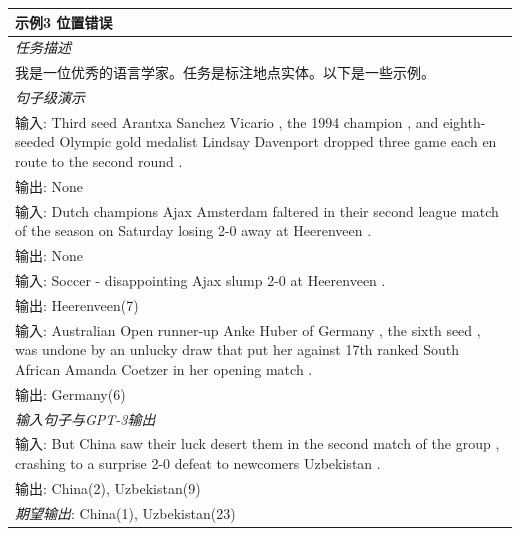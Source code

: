 \documentclass[supercite]{Experimental_Report}
\theoremstyle{definition}
\begin{document}
\begin{table}[th!]
{\begin{tabular}{l}
\textbf{示例3 {\color{red} 位置错误}} \\\midrule
       	\textit{任务描述} \\
我是一位优秀的语言学家。任务是标注地点实体。以下是一些示例。 \\\midrule
\textit{句子级演示} \\
输入: Third seed Arantxa Sanchez Vicario , the 1994 champion , and eighth-seeded Olympic gold medalist Lindsay Davenport dropped three game each en route to the second round . \\
输出: None \\
输入: Dutch champions Ajax Amsterdam faltered in their second league match of the season on Saturday losing 2-0 away at Heerenveen . \\
输出: None \\
输入: Soccer - disappointing Ajax slump 2-0 at Heerenveen . \\
输出: Heerenveen(7) \\
输入: Australian Open runner-up Anke Huber of Germany , the sixth seed , was undone by an unlucky draw that put her against 17th ranked South African Amanda Coetzer in her opening match . \\
输出: Germany(6) \\\midrule
\textit{输入句子与GPT-3输出} \\
输入: But China saw their luck desert them in the second match of the group , crashing to a surprise 2-0 defeat to newcomers Uzbekistan . \\
输出: China(2), Uzbekistan(9) \\
{\color{blue}\it 期望输出}: China(1), Uzbekistan(23) \\\bottomrule


\end{tabular}}
\end{table}
\end{document}
